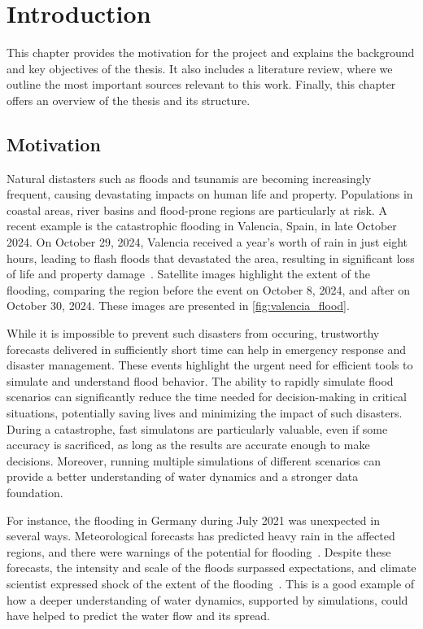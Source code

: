 \chapter{Introduction}
This chapter provides the motivation for the project and explains the background and key objectives of the thesis.
It also includes a literature review, where we outline the most important sources relevant to this work.
Finally, this chapter offers an overview of the thesis and its structure.

\section{Motivation}
Natural distasters such as floods and tsunamis are becoming increasingly frequent, causing devastating impacts on human life and property.
Populations in coastal areas, river basins and flood-prone regions are particularly at risk.
A recent example is the catastrophic flooding in Valencia, Spain, in late October 2024.
On October 29, 2024, Valencia received a year's worth of rain in just eight hours, leading to flash floods that devastated the area, resulting in significant loss of life and property damage~\cite{valencia_flood_disaster_esa}.
Satellite images highlight the extent of the flooding, comparing the region before the event on October 8, 2024, and after on October 30, 2024.
These images are presented in \autoref{fig:valencia_flood}.

While it is impossible to prevent such disasters from occuring, trustworthy forecasts delivered in sufficiently short time can help in emergency response and disaster management.
These events highlight the urgent need for efficient tools to simulate and understand flood behavior.
The ability to rapidly simulate flood scenarios can significantly reduce the time needed for decision-making in critical situations, potentially saving lives and minimizing the impact of such disasters.
During a catastrophe, fast simulatons are particularly valuable, even if some accuracy is sacrificed, as long as the results are accurate enough to make decisions.
Moreover, running multiple simulations of different scenarios can provide a better understanding of water dynamics and a stronger data foundation.

For instance, the flooding in Germany during July 2021 was unexpected in several ways.
Meteorological forecasts has predicted heavy rain in the affected regions, and there were warnings of the potential for flooding~\cite{fathom_floods_2021}.
Despite these forecasts, the intensity and scale of the floods surpassed expectations, and climate scientist expressed shock of the extent of the flooding~\cite{guardian_floods_2021}.
This is a good example of how a deeper understanding of water dynamics, supported by simulations, could have helped to predict the water flow and its spread.

